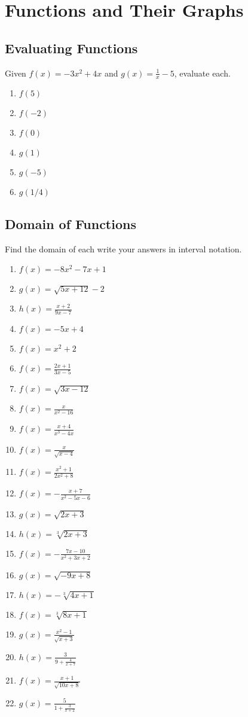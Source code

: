 \chapter{Functions and Their Graphs}

\section{Evaluating Functions}

Given $f(x) = -3x^2 + 4x$ and $g(x) = \frac{1}{x}-5$, evaluate each.
\begin{enumerate}
	\item $f(5)$
	\item $f(-2)$
	\item $f(0)$
	\item $g(1)$
	\item $g(-5)$
	\item $g(1/4)$
\end{enumerate}

\section{Domain of Functions}

Find the domain of each write your answers in interval notation.
\begin{enumerate}
	\item $f(x) = -8x^2 - 7x + 1$
	\item $g(x) = \sqrt{5x+12}-2$
	\item $h(x) = \frac{x+2}{9x-7}$
	\item $f(x) = -5x + 4$
	\item $f(x) = x^2 + 2$
	\item $f(x) = \frac{2x+1}{3x-5}$
	\item $f(x) = \sqrt{3x-12}$
	\item $f(x) = \frac{x}{x^2-16}$
	\item $f(x) = \frac{x+4}{x^3-4x}$
	\item $f(x) = \frac{x}{\sqrt{x-4}}$
	\item $f(x) = \frac{x^2+1}{2x^2+8}$
	\item $f(x) = -\frac{x+7}{x^2-5x-6}$
	\item $g(x) = \sqrt{2x+3}$
	\item $h(x) = \sqrt[3]{2x+3}$
	\item $f(x) = -\frac{7x-10}{x^2+3x+2}$
	\item $g(x) = \sqrt{-9x+8}$
	\item $h(x) = -\sqrt[3]{4x+1}$
	\item $f(x) = \sqrt[3]{8x+1}$
	\item $g(x) = \frac{x^2-1}{\sqrt{x+3}}$
	\item $h(x) = \frac{3}{9 + \frac{4}{x+7}}$
	\item $f(x) = \frac{x+1}{\sqrt{10x+8}}$
	\item $g(x) = \frac{5}{1+\frac{3}{x+2}}$
\end{enumerate}

